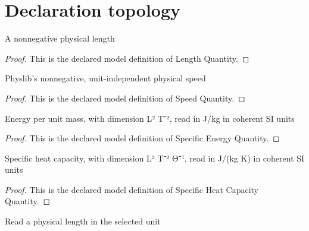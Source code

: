 \section{Declaration topology}
\begin{definition}
  \label{def:physics:phyx-mini-0332:phyxminiproblems-problemphyxmini0332-lengthquantity}
  A nonnegative physical length
\end{definition}
\begin{proof}
  This is the declared model definition of Length Quantity.
\end{proof}
\begin{definition}
  \label{def:physics:phyx-mini-0332:phyxminiproblems-problemphyxmini0332-speedquantity}
  Physlib's nonnegative, unit-independent physical speed
\end{definition}
\begin{proof}
  This is the declared model definition of Speed Quantity.
\end{proof}
\begin{definition}
  \label{def:physics:phyx-mini-0332:phyxminiproblems-problemphyxmini0332-specificenergyquantity}
  Energy per unit mass, with dimension L² T⁻², read in J/kg in coherent SI units
\end{definition}
\begin{proof}
  This is the declared model definition of Specific Energy Quantity.
\end{proof}
\begin{definition}
  \label{def:physics:phyx-mini-0332:phyxminiproblems-problemphyxmini0332-specificheatcapacityquantity}
  Specific heat capacity, with dimension L² T⁻² Θ⁻¹, read in J/(kg K) in coherent SI units
\end{definition}
\begin{proof}
  This is the declared model definition of Specific Heat Capacity Quantity.
\end{proof}
\begin{definition}
  \label{def:physics:phyx-mini-0332:phyxminiproblems-problemphyxmini0332-lengthreadout}
  Read a physical length in the selected unit
\end{definition}
